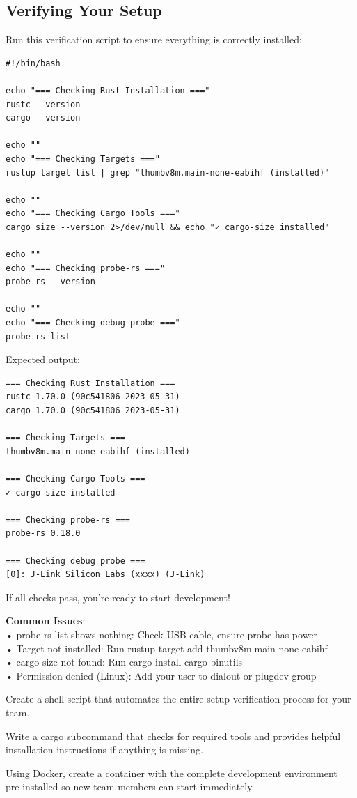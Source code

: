 \subsection{Verifying Your Setup}
\label{sec:verify-setup}

Run this verification script to ensure everything is correctly installed:
\begin{verbatim}
#!/bin/bash

echo "=== Checking Rust Installation ==="
rustc --version
cargo --version

echo ""
echo "=== Checking Targets ==="
rustup target list | grep "thumbv8m.main-none-eabihf (installed)"

echo ""
echo "=== Checking Cargo Tools ==="
cargo size --version 2>/dev/null && echo "✓ cargo-size installed"

echo ""
echo "=== Checking probe-rs ==="
probe-rs --version

echo ""
echo "=== Checking debug probe ==="
probe-rs list
\end{verbatim}

Expected output:
\begin{verbatim}
=== Checking Rust Installation ===
rustc 1.70.0 (90c541806 2023-05-31)
cargo 1.70.0 (90c541806 2023-05-31)

=== Checking Targets ===
thumbv8m.main-none-eabihf (installed)

=== Checking Cargo Tools ===
✓ cargo-size installed

=== Checking probe-rs ===
probe-rs 0.18.0

=== Checking debug probe ===
[0]: J-Link Silicon Labs (xxxx) (J-Link)
\end{verbatim}

If all checks pass, you're ready to start development!

\begin{tipbox}
    \textbf{Common Issues}:
    \\• probe-rs list shows nothing: Check USB cable, ensure probe has power
    \\• Target not installed: Run rustup target add thumbv8m.main-none-eabihf
    \\• cargo-size not found: Run cargo install cargo-binutils
    \\• Permission denied (Linux): Add your user to dialout or plugdev group
\end{tipbox}

\begin{exercise}[Easy]
    Create a shell script that automates the entire setup verification process for your team.
\end{exercise}

\begin{exercise}[Medium]
    Write a cargo subcommand that checks for required tools and provides helpful installation instructions if anything is missing.
\end{exercise}

\begin{exercise}[Hard]
    Using Docker, create a container with the complete development environment pre-installed so new team members can start immediately.
\end{exercise}
\clearpage
